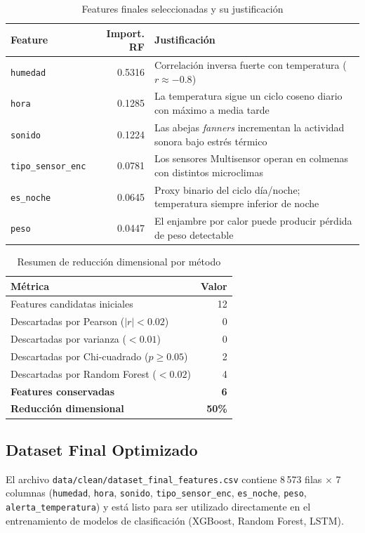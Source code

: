 \begin{table}[h!]
  \centering
  \caption{Features finales seleccionadas y su justificaci\'on}
  \begin{tabularx}{\textwidth}{lrX}
    \toprule
    \textbf{Feature} & \textbf{Import. RF} & \textbf{Justificaci\'on} \\
    \midrule
    \texttt{humedad}           & 0.5316 & Correlaci\'on inversa fuerte con temperatura ($r \approx -0.8$) \\
    \texttt{hora}              & 0.1285 & La temperatura sigue un ciclo coseno diario con m\'aximo a media tarde \\
    \texttt{sonido}            & 0.1224 & Las abejas \textit{fanners} incrementan la actividad sonora bajo estr\'es t\'ermico \\
    \texttt{tipo\_sensor\_enc} & 0.0781 & Los sensores Multisensor operan en colmenas con distintos microclimas \\
    \texttt{es\_noche}         & 0.0645 & Proxy binario del ciclo d\'ia/noche; temperatura siempre inferior de noche \\
    \texttt{peso}              & 0.0447 & El enjambre por calor puede producir p\'erdida de peso detectable \\
    \bottomrule
  \end{tabularx}
\end{table}

\begin{table}[h!]
  \centering
  \caption{Resumen de reducci\'on dimensional por m\'etodo}
  \begin{tabular}{lr}
    \toprule
    \textbf{M\'etrica} & \textbf{Valor} \\
    \midrule
    Features candidatas iniciales         & 12 \\
    Descartadas por Pearson ($|r|<0.02$)  & 0  \\
    Descartadas por varianza ($<0.01$)    & 0  \\
    Descartadas por Chi-cuadrado ($p\geq0.05$) & 2 \\
    Descartadas por Random Forest ($<0.02$) & 4 \\
    \textbf{Features conservadas}         & \textbf{6} \\
    \textbf{Reducci\'on dimensional}      & \textbf{50\%} \\
    \bottomrule
  \end{tabular}
\end{table}

\subsection{Dataset Final Optimizado}

El archivo \texttt{data/clean/dataset\_final\_features.csv} contiene 8\,573 filas
$\times$ 7 columnas (\texttt{humedad}, \texttt{hora}, \texttt{sonido},
\texttt{tipo\_sensor\_enc}, \texttt{es\_noche}, \texttt{peso},
\texttt{alerta\_temperatura}) y est\'a listo para ser utilizado directamente en el
entrenamiento de modelos de clasificaci\'on (XGBoost, Random Forest, LSTM).
